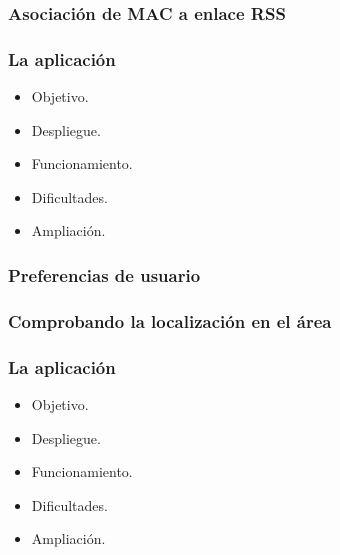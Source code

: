 
\begin{frame}
	\frametitle{Asociación de MAC a enlace RSS}
	
\end{frame}


\begin{frame}
	\frametitle{La aplicación \BulletPoint{}}
		\begin{itemize}
			\item Objetivo.
			\item Despliegue.
			\item Funcionamiento.
			\item Dificultades.
			\item Ampliación.
		\end{itemize}
		\endblock{}
\end{frame}


\begin{frame}
	\frametitle{Preferencias de usuario}
	
\end{frame}


\begin{frame}
	\frametitle{Comprobando la localización en el área}
	
\end{frame}


\begin{frame}
	\frametitle{La aplicación \BulletPoint{}}
		\begin{itemize}
			\item Objetivo.
			\item Despliegue.
			\item Funcionamiento.
			\item Dificultades.
			\item Ampliación.
		\end{itemize}
		\endblock{}
\end{frame}


